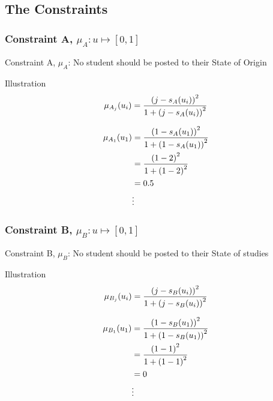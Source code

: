 \documentclass[10pt]{beamer}
\begin{document}
			\subsection{The Constraints}
			\begin{frame}
				\frametitle{Constraint A, $\mu_A\colon u\mapsto [0,1]$}
				Constraint A, $\mu_A$: No student should be posted to their State of Origin
				\begin{block}{Illustration}
					\begin{equation}
						\mu_{A_j}(u_i) = \frac{\left(j-s_A(u_i)\right)^2}{1 + \left(j-s_A(u_i)\right)^2} \notag
					\end{equation}
				\end{block}
				\begin{example}
					\begin{align}
						\mu_{A_1}(u_1) &= \frac{\left(1-s_A(u_1)\right)^2}{1 + \left(1-s_A(u_1)\right)^2} \notag\\
						&= \frac{\left(1-2\right)^2}{1 + \left(1-2\right)^2} \notag \\
						&= 0.5 \notag \\
						&\vdots \notag
					\end{align}
				\end{example}
			\end{frame}
			\begin{frame}
				\frametitle{Constraint B, $\mu_B\colon u\mapsto [0,1]$}
				Constraint B, $\mu_B$: No student should be posted to their State of studies
				\begin{block}{Illustration}
					\begin{equation}
						\mu_{B_j}(u_i) = \frac{\left(j-s_B(u_i)\right)^2}{1 + \left(j-s_B(u_i)\right)^2} \notag
					\end{equation}
				\end{block}
				\begin{example}
					\begin{align}
						\mu_{B_1}(u_1) &= \frac{\left(1-s_B(u_1)\right)^2}{1 + \left(1-s_B(u_1)\right)^2}\notag\\
						&= \frac{\left(1-1\right)^2}{1 + \left(1-1\right)^2} \notag \\
						&= 0 \notag \\
						&\vdots \notag
					\end{align}
				\end{example}
			\end{frame}
\end{document}
